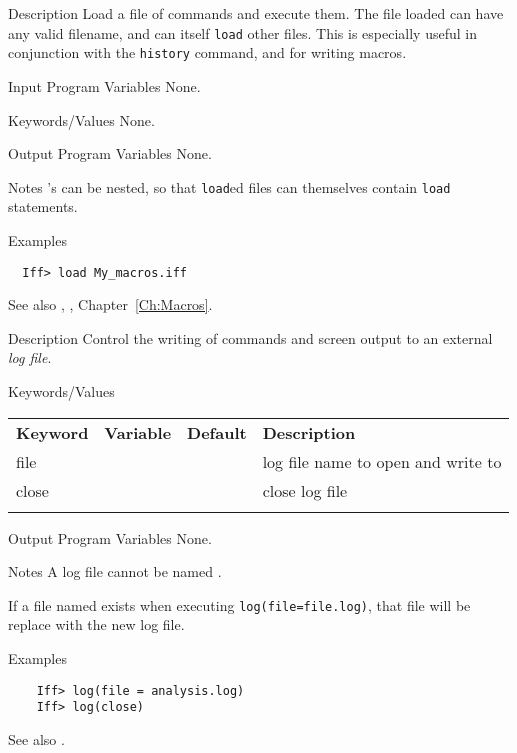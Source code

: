 \begin{IFFcom}
\item[Description] Load a file of {\ifeffit} commands and execute them.
  The file loaded can have any valid filename, and can itself
  {\texttt{load}} other files.  This is especially useful in conjunction
  with the {\texttt{history}} command, and for writing macros.
\item[Input Program Variables] None.
\item[Keywords/Values] None.
\item[Output Program Variables] None.  
\item[Notes]  {}'s can be nested, so that {\tt{load}}ed files
  can themselves contain {\tt{load}} statements. 
\item[Examples] {\hspace{1.in} \vspace{-0.1truein} \relax }
\begin{verbatim} 
  Iff> load My_macros.iff
\end{verbatim}
  \item[See also] {}, {},
  Chapter~{\ref{Ch:Macros}}. 
\end{IFFcom}


\begin{IFFcom}
\item[Description] Control the writing of commands and screen output to an
  external {\emph{log file}}.
\item[Keywords/Values] 
\begin{tabular}{llrl}
  \textbf{Keyword} & \textbf{Variable} & \textbf{Default} &
  \textbf{Description}\\
  \noalign{\smallskip}
  {file}   &  &         & log file name to open and write to\\
  {close}  &  &   & close log file\\
  \noalign{\smallskip}
\end{tabular}

\item[Output Program Variables] None.
\item[Notes] A log file cannot be named {}. 

  If a file named
  {} exists when executing {\tt{log(file=file.log)}}, that
  file will be replace with the new log file.
\item[Examples] {\hspace{1.in} \vspace{-0.1truein} \relax }
\begin{verbatim} 
    Iff> log(file = analysis.log)
    Iff> log(close)
\end{verbatim}
\item[See also] {}.
\end{IFFcom}



